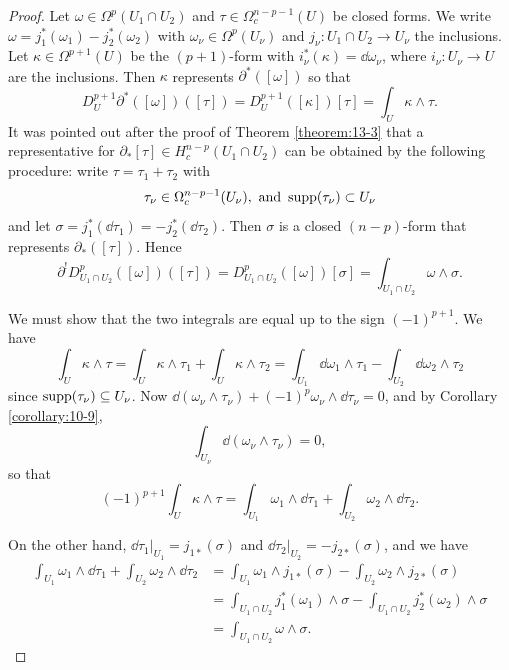\begin{proof}
  Let $\omega\in\Omega^p(U_1\cap U_2)$ and $\tau\in\Omega_c^{n-p-1}(U)$ be closed forms. We write 
  $\omega=j_1^*(\omega_1) - j_2^*(\omega_2)$ with $\omega_\nu\in\Omega^p(U_\nu)$ and $j_\nu:U_1\cap U_2\to U_\nu$ the 
  inclusions. Let $\kappa\in\Omega^{p+1}(U)$ be the $(p+1)$-form with $i_\nu^*(\kappa)=\dd\omega_\nu$, where $i_\nu:U_\nu\to U$
  are the inclusions. Then $\kappa$ represents $\partial^*([\omega])$ so that 
  \[
    D_U^{p+1}\partial^*([\omega])([\tau]) 
    = D_U^{p+1}([\kappa])[\tau]
    = \int_U\kappa\wedge\tau.
  \]
  It was pointed out after the proof of Theorem \ref{theorem:13-3} that a representative for 
  $\partial_*[\tau]\in H_c^{n-p}(U_1\cap U_2)$ can be obtained by the following procedure: write
  $\tau=\tau_1+\tau_2$ with
  \[
    \tau_\nu\in\Omega_c^{n-p-1}(U_\nu),\text{ and } \operatorname{supp}(\tau_\nu)\subset U_\nu
  \]
  and let $\sigma=j_1^*(\!\dd\tau_1)=-j_2^*(\!\dd\tau_2)$. Then $\sigma$ is a closed $(n-p)$-form that represents
  $\partial_*([\tau])$. Hence 
  \[
    \partial^!D_{U_1\cap U_2}^p([\omega])([\tau]) 
    = D_{U_1\cap U_2}^p([\omega])[\sigma]
    = \int_{U_1\cap U_2}\omega\wedge\sigma. 
  \]

  We must show that the two integrals are equal up to the sign $(-1)^{p+1}$. We have
  \[
    \int_U \kappa\wedge\tau 
    = \int_U \kappa\wedge\tau_1 + \int_U \kappa\wedge\tau_2
    = \int_{U_1} \dd\omega_1\wedge\tau_1 - \int_{U_2} \dd\omega_2\wedge\tau_2
  \]
  since $\operatorname{supp}(\tau_\nu)\subseteq U_\nu$. Now $\dd(\omega_\nu\wedge\tau_\nu) + (-1)^p\omega_\nu\wedge\!\dd\tau_\nu = 0$,
  and by Corollary \ref{corollary:10-9},
  \[
    \int_{U_\nu} \!\dd(\omega_\nu\wedge\tau_\nu) = 0,
  \]
  so that 
  \[
    (-1)^{p+1}\int_U\kappa\wedge\tau 
    = \int_{U_1}\omega_1\wedge\!\dd\tau_1 + \int_{U_2}\omega_2\wedge\!\dd\tau_2.
  \]

  On the other hand, $\dd\tau_1|_{U_1}=j_{1*}(\sigma)$ and $\dd\tau_2|_{U_2}=-j_{2*}(\sigma)$, and we have 
  \begin{align*}
    \int_{U_1}\omega_1\wedge\!\dd\tau_1 + \int_{U_2}\omega_2\wedge\!\dd\tau_2
    & = \int_{U_1}\omega_1\wedge j_{1*}(\sigma) - \int_{U_2}\omega_2\wedge j_{2*}(\sigma)\\
    & = \int_{U_1\cap U_2}j_{1}^*(\omega_1)\wedge\sigma - \int_{U_1\cap U_2}j_{2}^*(\omega_2)\wedge\sigma\\
    & = \int_{U_1\cap U_2}\omega\wedge\sigma.
  \end{align*}
\end{proof}

